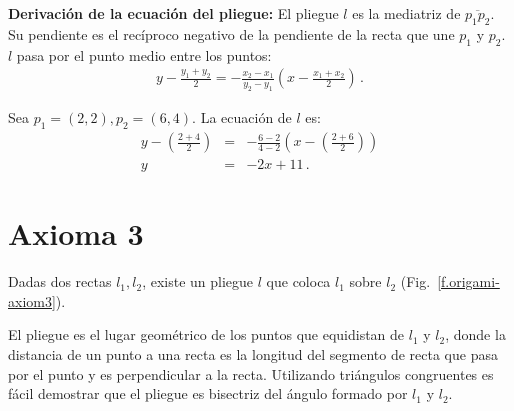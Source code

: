 \noindent\textbf{Derivación de la ecuación del pliegue:}
El pliegue $l$ es la mediatriz de $\overline{p_1p_2}$. Su pendiente es el recíproco negativo de la pendiente de la recta que une $p_1$ y $p_2$. $l$ pasa por el punto medio entre los puntos:
\begin{align}
y - \frac{y_1+y_2}{2} = -\frac{x_2-x_1}{y_2-y_1}\left(x-\frac{x_1+x_2}{2}\right)\,.\label{eq.midpoint1}
\end{align}

\begin{example}
Sea $p_1=(2,2), p_2=(6,4)$. La ecuación de $l$ es:
\begin{eqnarray*}
y-\left(\frac{2+4}{2}\right)&=&-\frac{6-2}{4-2}\left(x-\left(\frac{2+6}{2}\right)\right)\\
y&=&-2x+11\,.
\end{eqnarray*}
\end{example}



\section{Axioma 3}\label{s.ax3}

\begin{axiom}
Dadas dos rectas $l_1,l_2$, existe un pliegue $l$ que coloca $l_1$ sobre $l_2$ (Fig.~\ref{f.origami-axiom3}).
\end{axiom}

El pliegue es el lugar geométrico de los puntos que equidistan de $l_1$ y $l_2$, donde la distancia de un punto a una recta es la longitud del segmento de recta que pasa por el punto y es perpendicular a la recta. Utilizando triángulos congruentes es fácil demostrar que el pliegue es bisectriz del ángulo formado por $l_1$ y $l_2$.

